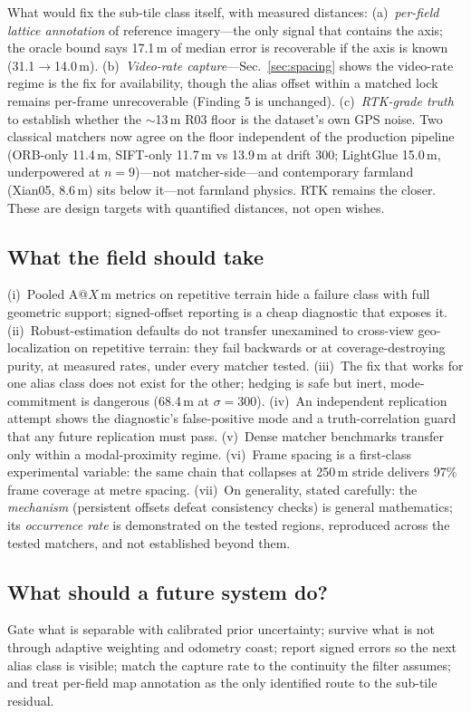 \documentclass[journal]{IEEEtran}
\begin{document}
What would fix the sub-tile class itself, with measured distances: (a)~\emph{per-field lattice annotation} of reference imagery---the only signal that contains the axis; the oracle bound says 17.1\,m of median error is recoverable if the axis is known (31.1$\to$14.0\,m). (b)~\emph{Video-rate capture}---Sec.~\ref{sec:spacing} shows the video-rate regime is the fix for availability, though the alias offset within a matched lock remains per-frame unrecoverable (Finding 5 is unchanged). (c)~\emph{RTK-grade truth} to establish whether the $\sim$13\,m R03 floor is the dataset's own GPS noise. Two classical matchers now agree on the floor independent of the production pipeline (ORB-only 11.4\,m, SIFT-only 11.7\,m vs 13.9\,m at drift 300; LightGlue 15.0\,m, underpowered at $n{=}9$)---not matcher-side---and contemporary farmland (Xian05, 8.6\,m) sits below it---not farmland physics. RTK remains the closer. These are design targets with quantified distances, not open wishes.

\subsection{What the field should take}
(i)~Pooled A@$X$\,m metrics on repetitive terrain hide a failure class with full geometric support; signed-offset reporting is a cheap diagnostic that exposes it. (ii)~Robust-estimation defaults do not transfer unexamined to cross-view geo-localization on repetitive terrain: they fail backwards or at coverage-destroying purity, at measured rates, under every matcher tested. (iii)~The fix that works for one alias class does not exist for the other; hedging is safe but inert, mode-commitment is dangerous (68.4\,m at $\sigma=300$). (iv)~An independent replication attempt shows the diagnostic's false-positive mode and a truth-correlation guard that any future replication must pass. (v)~Dense matcher benchmarks transfer only within a modal-proximity regime. (vi)~Frame spacing is a first-class experimental variable: the same chain that collapses at 250\,m stride delivers 97\% frame coverage at metre spacing. (vii)~On generality, stated carefully: the \emph{mechanism} (persistent offsets defeat consistency checks) is general mathematics; its \emph{occurrence rate} is demonstrated on the tested regions, reproduced across the tested matchers, and not established beyond them.

\subsection{What should a future system do?}
Gate what is separable with calibrated prior uncertainty; survive what is not through adaptive weighting and odometry coast; report signed errors so the next alias class is visible; match the capture rate to the continuity the filter assumes; and treat per-field map annotation as the only identified route to the sub-tile residual.
\end{document}

